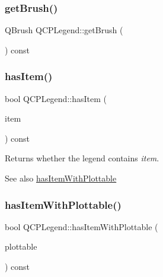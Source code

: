 \subsubsection{\texorpdfstring{getBrush()}{getBrush()}}
{\footnotesize\ttfamily Q\+Brush Q\+C\+P\+Legend\+::get\+Brush (\begin{DoxyParamCaption}{ }\end{DoxyParamCaption}) const\hspace{0.3cm}{\ttfamily [protected]}}

\mbox{\label{class_q_c_p_legend_ad0f698e33db454a6c103b5206740e599}} 
\subsubsection{\texorpdfstring{hasItem()}{hasItem()}}
{\footnotesize\ttfamily bool Q\+C\+P\+Legend\+::has\+Item (\begin{DoxyParamCaption}\item[{\mbox{\hyperlink{class_q_c_p_abstract_legend_item}{Q\+C\+P\+Abstract\+Legend\+Item}} $\ast$}]{item }\end{DoxyParamCaption}) const}

Returns whether the legend contains {\itshape item}.

\begin{DoxySeeAlso}{See also}
\mbox{\hyperlink{class_q_c_p_legend_a4b90a442af871582df85c2bc13f91e88}{has\+Item\+With\+Plottable}} 
\end{DoxySeeAlso}
\mbox{\label{class_q_c_p_legend_a4b90a442af871582df85c2bc13f91e88}} 
\subsubsection{\texorpdfstring{hasItemWithPlottable()}{hasItemWithPlottable()}}
{\footnotesize\ttfamily bool Q\+C\+P\+Legend\+::has\+Item\+With\+Plottable (\begin{DoxyParamCaption}\item[{const \mbox{\hyperlink{class_q_c_p_abstract_plottable}{Q\+C\+P\+Abstract\+Plottable}} $\ast$}]{plottable }\end{DoxyParamCaption}) const}

